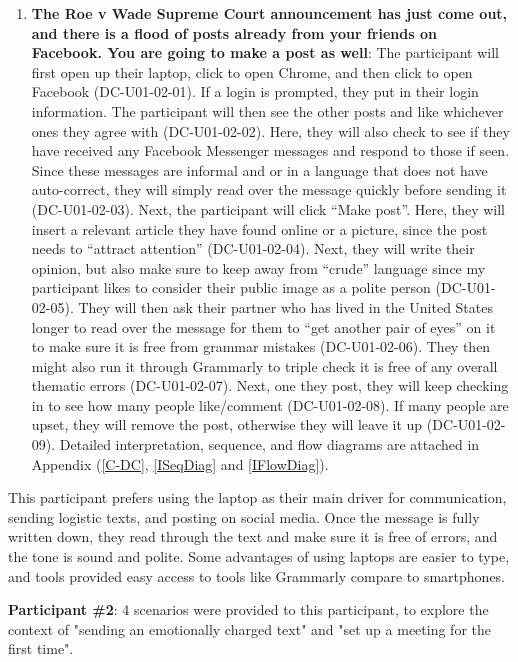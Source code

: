 \documentclass[acmsmall,screen,authorversion,nonacm]{acmart}
\begin{document}
\begin{center}
\begin{enumerate}
    \item \textbf{The Roe v Wade Supreme Court announcement has just come out, and there is a flood of posts already from your friends on Facebook. You are going to make a post as well}: The participant will first open up their laptop, click to open Chrome, and then click to open Facebook (DC-U01-02-01). If a login is prompted, they put in their login information. The participant will then see the other posts and like whichever ones they agree with (DC-U01-02-02). Here, they will also check to see if they have received any Facebook Messenger messages and respond to those if seen. Since these messages are informal and or in a language that does not have auto-correct, they will simply read over the message quickly before sending it (DC-U01-02-03). Next, the participant will click “Make post”. Here, they will insert a relevant article they have found online or a picture, since the post needs to “attract attention” (DC-U01-02-04). Next, they will write their opinion, but also make sure to keep away from “crude” language since my participant likes to consider their public image as a polite person (DC-U01-02-05). They will then ask their partner who has lived in the United States longer to read over the message for them to “get another pair of eyes” on it to make sure it is free from grammar mistakes (DC-U01-02-06). They then might also run it through Grammarly to triple check it is free of any overall thematic errors (DC-U01-02-07). Next, one they post, they will keep checking in to see how many people like/comment (DC-U01-02-08). If many people are upset, they will remove the post, otherwise they will leave it up (DC-U01-02-09). Detailed interpretation, sequence, and flow diagrams are attached in Appendix (\ref{C-DC}, \ref{ISeqDiag} and \ref{IFlowDiag}). 
\end{enumerate}
\end{center}

This participant prefers using the laptop as their main driver for communication, sending logistic texts, and posting on social media. Once the message is fully written down, they read through the text and make sure it is free of errors, and the tone is sound and polite. Some advantages of using laptops are easier to type, and tools provided easy access to tools like Grammarly compare to smartphones. 

\vspace{7pt}

\textbf{Participant \#2}: 4 scenarios were provided to this participant, to explore the context of "sending an emotionally charged text" and "set up a meeting for the first time".
\end{document}

